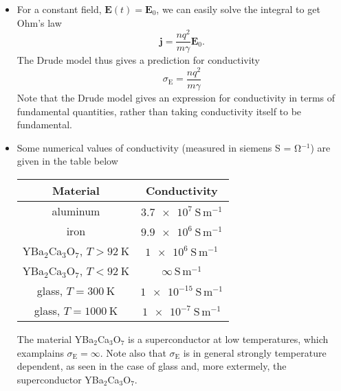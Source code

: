 \documentclass[11pt, a4paper]{article}
\renewcommand{\vec}[1]{\bm{#1}} %
\newcommand{\E}{\vec{E}} %
\renewcommand{\j}{\vec{j}}  %
\begin{document}
\begin{itemize}
	\item For a constant field, $ \E(t) = \E_{0} $, we can easily solve the integral to get Ohm's law
	\begin{equation*}
		\j = \frac{nq^{2}}{m\gamma}\E_{0}.
	\end{equation*}
	The Drude model thus gives a prediction for conductivity
	\begin{equation*}
		\sigma_{\mathrm{E}} = \frac{nq^{2}}{m \gamma}
	\end{equation*}
    Note that the Drude model gives an expression for conductivity in terms of fundamental quantities, rather than taking conductivity itself to be fundamental.
	
	\item Some numerical values of conductivity (measured in siemens \si{\siemens} = $ \si{\ohm^{-1}} $) are given in the table below
	\begin{center}
	\begin{tabular}{c|c}
		Material & Conductivity\\
		\hline {\rule{0pt}{2.6ex}} \hspace{-7pt}
		aluminum & $ \SI{3.7e7}{\siemens \, \meter^{-1}} $\\
		iron & $ \SI{9.9e6}{\siemens \, \meter^{-1}} $\\
		YBa$ _{2} $Ca$ _{3} $O$ _{7} $, $ T > \SI{92}{\kelvin} $ & $ \SI{1e6}{\siemens \, \meter^{-1}} $\\
		YBa$ _{2} $Ca$ _{3} $O$ _{7} $, $ T < \SI{92}{\kelvin} $ & $ \infty \, \si{\siemens \, \meter^{-1}} $\\
		glass, $ T = \SI{300}{\kelvin} $ & $ \SI{1e-15}{\siemens \, \meter^{-1}} $\\
		glass, $ T = \SI{1000}{\kelvin} $ & $ \SI{1e-7}{\siemens \, \meter^{-1}} $\\
	\end{tabular}
	\end{center}
    The material YBa$ _{2} $Ca$ _{3} $O$ _{7} $ is a superconductor at low temperatures, which examplains $ \sigma_{\text{E}} = \infty $. Note also that $ \sigma_{\mathrm{E}} $ is in general strongly temperature dependent, as seen in the case of glass and, more extermely, the superconductor YBa$ _{2} $Ca$ _{3} $O$ _{7} $.
	
\end{itemize}
\end{document}
